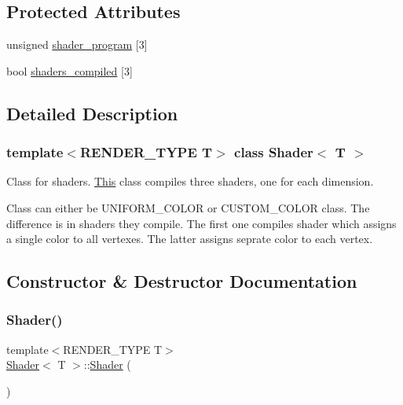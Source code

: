 \subsection*{Protected Attributes}
\begin{DoxyCompactItemize}
\item 
unsigned \mbox{\hyperlink{classShader_af8ec4edd2b1b56f32ce416280ff9b9e1}{shader\+\_\+program}} \mbox{[}3\mbox{]}
\item 
bool \mbox{\hyperlink{classShader_a057162ea090f838f7fbb658cb301efc4}{shaders\+\_\+compiled}} \mbox{[}3\mbox{]}
\end{DoxyCompactItemize}


\subsection{Detailed Description}
\subsubsection*{template$<$R\+E\+N\+D\+E\+R\+\_\+\+T\+Y\+PE T$>$\newline
class Shader$<$ T $>$}

Class for shaders. \mbox{\hyperlink{classThis}{This}} class compiles three shaders, one for each dimension. 

Class can either be U\+N\+I\+F\+O\+R\+M\+\_\+\+C\+O\+L\+OR or C\+U\+S\+T\+O\+M\+\_\+\+C\+O\+L\+OR class. The difference is in shaders they compile. The first one compiles shader which assigns a single color to all vertexes. The latter assigns seprate color to each vertex. 

\subsection{Constructor \& Destructor Documentation}
\mbox{\label{classShader_a02faa1d7140779d7a24e06d1aff58d68}} 
\subsubsection{\texorpdfstring{Shader()}{Shader()}\hspace{0.1cm}{\footnotesize\ttfamily [1/3]}}
{\footnotesize\ttfamily template$<$R\+E\+N\+D\+E\+R\+\_\+\+T\+Y\+PE T$>$ \\
\mbox{\hyperlink{classShader}{Shader}}$<$ T $>$\+::\mbox{\hyperlink{classShader}{Shader}} (\begin{DoxyParamCaption}{ }\end{DoxyParamCaption})\hspace{0.3cm}{\ttfamily [inline]}}

